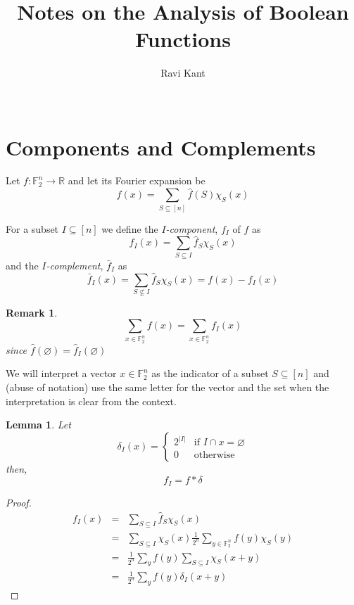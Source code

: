 \documentclass{sig-alternate}
\newtheorem{lemma}[theorem]{Lemma}
\newtheorem{remark}[theorem]{Remark}
\newenvironment{definition}[1][Definition]{\begin{trivlist}
\item[\hskip \labelsep {\bfseries #1}]}{\end{trivlist}}
\begin{document}
\title{Notes on the Analysis of Boolean Functions}

\author{
 \alignauthor Ravi Kant \\
 \\
}

\maketitle

\section{Components and Complements}
Let $f:\mathbb{F}_2^n \rightarrow \mathbb{R}$ and let its Fourier expansion be
\[ f(x) = \sum_{S\subseteq [n]}\hat{f}(S)\chi_S(x) \]
\begin{definition}
For a subset $I\subseteq [n]$ we define the $I${\em -component}, $f_I$ of $f$ as
\[ f_I(x) = \sum_{S\subseteq I}\hat{f}_S\chi_S(x) \]
and the $I${\em -complement}, $\bar{f}_I$ as
\[ \bar{f}_I(x) = \sum_{S\nsubseteq I}\hat{f}_S\chi_S(x) = f(x) - f_I(x) \]
\end{definition}

\begin{remark}
\[ \sum_{x\in\mathbb{F}_2^n}f(x) = \sum_{x\in\mathbb{F}_2^n}f_I(x)\] since $\hat{f}(\varnothing) = \hat{f}_I(\varnothing)$
\end{remark}

We will interpret a vector $x \in \mathbb{F}_2^n$ as the indicator of a subset $S\subseteq [n]$ and (abuse of notation) use the same letter for the vector and the set when the interpretation is clear from the context.

\begin{lemma}
 Let 
 \[\delta_I(x) = \begin{cases} 2^{|I|} & \text{if } I\cap x = \varnothing \\ 0 & \text{otherwise}\end{cases} \]
then,
\[ f_I = f * \delta \]
\end{lemma}

\begin{proof}
\begin{eqnarray*}
   f_I(x) &=& \sum_{S\subseteq I}\hat{f}_S\chi_S(x) \\
            &=& \sum_{S\subseteq I}\chi_S(x)\frac{1}{2^n}\sum_{y\in \mathbb{F}_2^n}f(y)\chi_S(y) \\
            &=& \frac{1}{2^n}\sum_yf(y)\sum_{S\subseteq I} \chi_S(x+y) \\
            &=& \frac{1}{2^n}\sum_yf(y)\delta_I(x+y)
\end{eqnarray*}
\end{proof}
\end{document}
